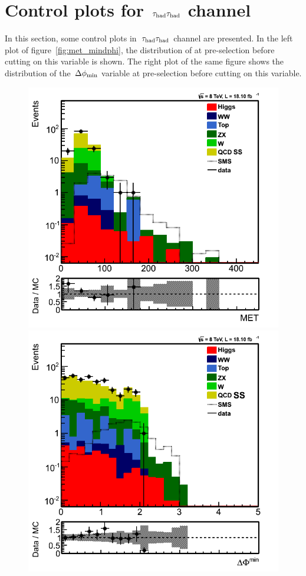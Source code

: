 \section{\texorpdfstring{Control plots for $\,\tau_{\rm had}\tau_{\rm had}$ channel}{Control plots for tau-tau channel}}
In this section, some control plots in $\,\tau_{\rm had}\tau_{\rm had}$ channel are presented. In the left plot of figure~\ref{fig:met_mindphi}, the distribution of \MPT at pre-selection before cutting on this variable is shown. The right plot of the same figure shows the distribution of the $\,{\Delta\phi_{\rm min}}$ variable at pre-selection before cutting on this variable.
\begin{figure}[!Hhtb]
\centering
\includegraphics[angle=0,scale=0.35]{TauTauFigs/MET2.png}
\includegraphics[angle=0,scale=0.35]{TauTauFigs/DPhimin.png} \\

\end{figure}
